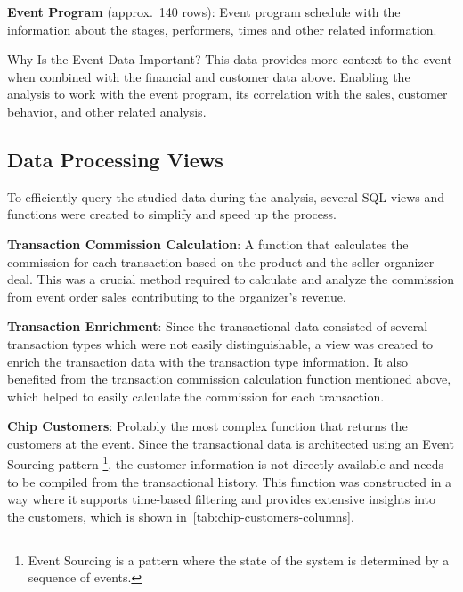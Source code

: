 \textbf{Event Program} (approx.\ 140 rows): Event program schedule with the information about the stages, performers, times and other related information.

\begin{blue-box}{Why Is the Event Data Important?}
	This data provides more context to the event when combined with the financial and customer data above.
	Enabling the analysis to work with the event program, its correlation with the sales, customer behavior, and other related analysis.
\end{blue-box}

\subsection{Data Processing Views}
\label{subsec:data-methodology-structure-views}
To efficiently query the studied data during the analysis, several SQL views and functions were created to simplify and speed up the process.

\textbf{Transaction Commission Calculation}: A function that calculates the commission for each transaction based on the product and the seller-organizer deal.
This was a crucial method required to calculate and analyze the commission from event order sales contributing to the organizer's revenue.

\textbf{Transaction Enrichment}: Since the transactional data consisted of several transaction types which were not easily distinguishable, a view was created to enrich the transaction data with the transaction type information.
It also benefited from the transaction commission calculation function mentioned above, which helped to easily calculate the commission for each transaction.

\textbf{Chip Customers}: Probably the most complex function that returns the customers at the event.
Since the transactional data is architected using an Event Sourcing pattern
\footnote{Event Sourcing is a pattern where the state of the system is determined by a sequence of events\cite{aw_implementing_event_sourcing_using_a_relational_database}.}, the customer information
is not directly available and needs to be compiled from the transactional history.
This function was constructed in a way where it supports time-based filtering and provides extensive insights into the customers, which is shown in~\autoref{tab:chip-customers-columns}.

